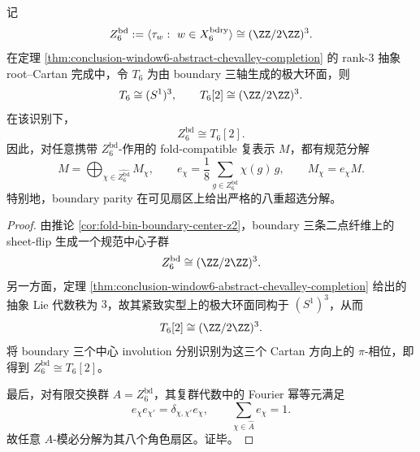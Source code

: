 \begin{theorem}\label{thm:conclusion-window6-boundary-torus-2torsion}
记
\[
Z_6^{\mathrm{bd}}
:=
\langle \tau_w:\ w\in X_6^{\mathrm{bdry}}\rangle
\cong (\ZZ/2\ZZ)^3.
\]
在定理 \ref{thm:conclusion-window6-abstract-chevalley-completion} 的 rank-\(3\) 抽象 root--Cartan 完成中，令 \(T_6\) 为由 boundary 三轴生成的极大环面，则
\[
T_6\cong (S^1)^3,
\qquad
T_6[2]\cong (\ZZ/2\ZZ)^3.
\]
在该识别下，
\[
Z_6^{\mathrm{bd}}\cong T_6[2].
\]
因此，对任意携带 \(Z_6^{\mathrm{bd}}\)-作用的 fold-compatible 复表示 \(M\)，都有规范分解
\[
M=\bigoplus_{\chi\in \widehat{Z_6^{\mathrm{bd}}}} M_\chi,
\qquad
e_\chi=\frac{1}{8}\sum_{g\in Z_6^{\mathrm{bd}}}\chi(g)\,g,
\qquad
M_\chi=e_\chi M.
\]
特别地，boundary parity 在可见扇区上给出严格的八重超选分解。
\end{theorem}
\begin{proof}
由推论 \ref{cor:fold-bin-boundary-center-z2}，boundary 三条二点纤维上的 sheet-flip 生成一个规范中心子群
\[
Z_6^{\mathrm{bd}}\cong (\ZZ/2\ZZ)^3.
\]
另一方面，定理 \ref{thm:conclusion-window6-abstract-chevalley-completion} 给出的抽象 Lie 代数秩为 \(3\)，故其紧致实型上的极大环面同构于 \((S^1)^3\)，从而
\[
T_6[2]\cong (\ZZ/2\ZZ)^3.
\]
将 boundary 三个中心 involution 分别识别为这三个 Cartan 方向上的 \(\pi\)-相位，即得到 \(Z_6^{\mathrm{bd}}\cong T_6[2]\)。

最后，对有限交换群 \(A=Z_6^{\mathrm{bd}}\)，其复群代数中的 Fourier 幂等元满足
\[
e_\chi e_{\chi'}=\delta_{\chi,\chi'}e_\chi,
\qquad
\sum_{\chi\in \widehat A}e_\chi=1.
\]
故任意 \(A\)-模必分解为其八个角色扇区。证毕。
\end{proof}

